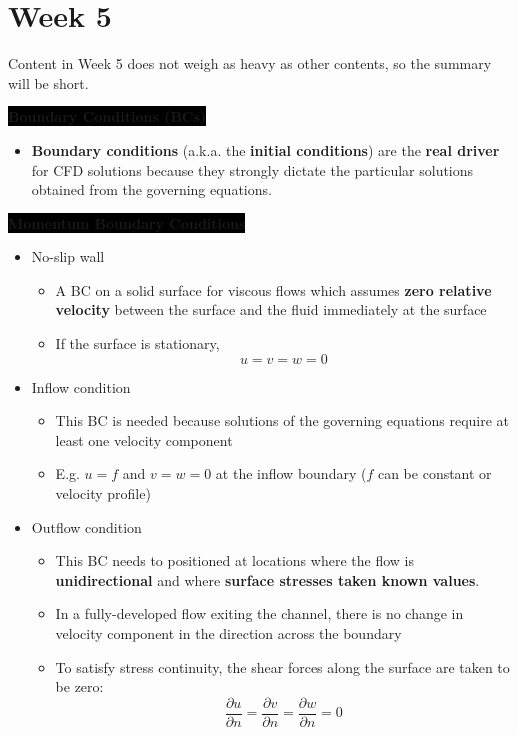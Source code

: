 \section{Week 5}

Content in Week 5 does not weigh as heavy as other contents, so the summary will be short.

\vspace{0.5cm}

\colorbox{black}{\textbf{\color{white}Boundary Conditions (BCs)}}
\begin{itemize}
    \item \textbf{\color{red}Boundary conditions} (a.k.a. the \textbf{\color{red}initial conditions}) are the \textbf{\color{blue}real driver} for CFD solutions because they strongly dictate the particular solutions obtained from the governing equations.
\end{itemize}

\colorbox{black}{\textbf{\color{white}Momentum Boundary Conditions}}
\begin{itemize}
    \item No-slip wall
    \begin{itemize}
        \item A BC on a solid surface for viscous flows which assumes \textbf{\color{teal}zero relative velocity} between the surface and the fluid immediately at the surface
        \item If the surface is stationary,
        \begin{equation*}
            u=v=w=0
        \end{equation*}
    \end{itemize}
    \item Inflow condition
    \begin{itemize}
        \item This BC is needed because solutions of the governing equations require at least one velocity component
        \item E.g. $u=f$ and $v=w=0$ at the inflow boundary ($f$ can be constant or velocity profile)
    \end{itemize}
    \item Outflow condition
    \begin{itemize}
        \item This BC needs to positioned at locations where the flow is \textbf{\color{red}unidirectional} and where \textbf{\color{blue}surface stresses taken known values}.
        \item In a fully-developed flow exiting the channel, there is no change in velocity component in the direction across the boundary
        \item To satisfy stress continuity, the shear forces along the surface are taken to be zero:
        \begin{equation*}
            \frac{\partial u}{\partial n} = \frac{\partial v}{\partial n} = \frac{\partial w}{\partial n} = 0
        \end{equation*}
    \end{itemize}
\end{itemize}


